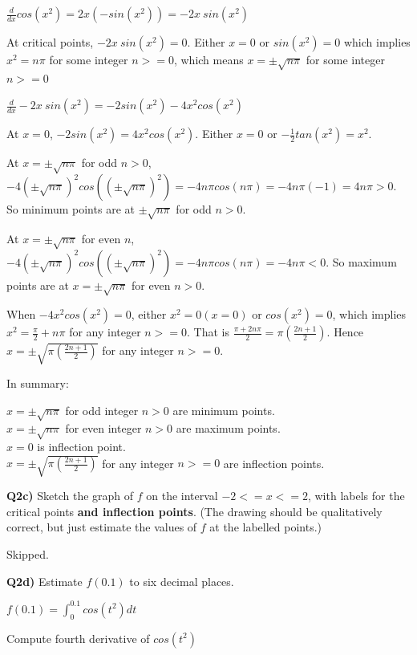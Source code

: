 \documentclass[9pt]{article}
\begin{document}
$\frac{d}{dx}cos(x^2) = 2x(-sin(x^2)) = -2x\ sin(x^2)$

At critical points, $-2x\ sin(x^2) = 0$. Either $x = 0$ or $sin(x^2) = 0$ which implies $x^2 = n\pi$ for some integer $n >= 0$, which means $x = \pm\sqrt{n\pi}$ for some integer $n >= 0$

$\frac{d}{dx}-2x\ sin(x^2) = -2sin(x^2) - 4x^2cos(x^2)$

At $x = 0$, $-2sin(x^2) = 4x^2cos(x^2)$. Either $x = 0$ or $-\frac{1}{2}tan(x^2) = x^2$.

At $x = \pm\sqrt{n\pi}$ for odd $n > 0$, $-4(\pm\sqrt{n\pi})^2cos((\pm\sqrt{n\pi})^2) = -4n\pi cos(n\pi) = -4n\pi (-1) = 4n\pi > 0$. So minimum points are at $\pm\sqrt{n\pi}$ for odd $n > 0$.

At $x = \pm\sqrt{n\pi}$ for even $n$, $-4(\pm\sqrt{n\pi})^2cos((\pm\sqrt{n\pi})^2) = -4n\pi cos(n\pi) = -4n \pi < 0$. So maximum points are at $x = \pm\sqrt{n\pi}$ for even $n > 0$.

When $-4x^2cos(x^2) = 0$, either $x^2 = 0 (x = 0)$ or $cos(x^2) = 0$, which implies $x^2 = \frac{\pi}{2} + n\pi$ for any integer $n >= 0$. That is $\frac{\pi + 2n\pi}{2} = \pi(\frac{2n + 1}{2})$. Hence $x = \pm\sqrt{\pi(\frac{2n + 1}{2})}$ for any integer $n >= 0$.

In summary:

$x = \pm\sqrt{n\pi}$ for odd integer $n > 0$ are minimum points. \\
$x = \pm\sqrt{n\pi}$ for even integer $n > 0$ are maximum points. \\
$x = 0$ is inflection point. \\
$x = \pm\sqrt{\pi(\frac{2n+1}{2})}$ for any integer $n >= 0$ are inflection points.


\begin{tcolorbox}
  \textbf{Q2c)} Sketch the graph of $f$ on the interval $-2 <= x <= 2$, with labels for the critical points \textbf{and inflection points}. (The drawing should be qualitatively correct, but just estimate the values of $f$ at the labelled points.)
\end{tcolorbox}

Skipped.


\begin{tcolorbox}
  \textbf{Q2d)} Estimate $f(0.1)$ to six decimal places.
\end{tcolorbox}

$f(0.1) = \int_0^{0.1} cos(t^2) dt$

Compute fourth derivative of $cos(t^2)$
\end{document}

